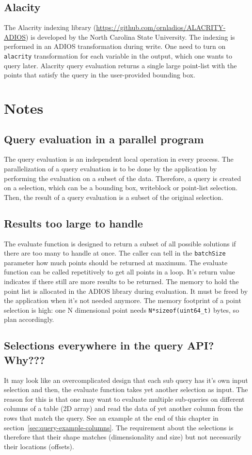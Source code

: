 \subsection{Alacity}
The Alacrity indexing library (\url{https://github.com/ornladios/ALACRITY-ADIOS}) is developed by the North Carolina State University. The indexing is performed in an ADIOS transformation during write. One need to turn on \verb+alacrity+ transformation for each variable in the output, which one wants to query later. Alacrity query evaluation returns a single large point-list with the points that satisfy the query in the user-provided bounding box. 


%
%
\section{Notes}

\subsection{Query evaluation in a parallel program}
The query evaluation is an independent local operation in every process. The parallelization of a query evaluation is to be done by the application by performing the evaluation on a subset of the data. Therefore, a query is created on a selection, which can be a bounding box, writeblock or point-list selection. Then, the result of a query evaluation is a subset of the original selection.  

\subsection{Results too large to handle}
The evaluate function is designed to return a subset of all possible solutions if there are too many to handle at once. The caller can tell in the \verb+batchSize+ parameter how much points should be returned at maximum. The evaluate function can be called repetitively to get all points in a loop. It's return value indicates if there still are more results to be returned. The memory to hold the point list is allocated in the ADIOS library during evaluation. It must be freed by the application when it's not needed anymore. The memory footprint of a point selection is high: one N dimensional point needs \verb+N*sizeof(uint64_t)+ bytes, so plan accordingly. 

\subsection{Selections everywhere in the query API? Why???}
It may look like an overcomplicated design that each sub query has it's own input selection and then, the evaluate function takes yet another selection as input. The reason for this is that one may want to evaluate multiple sub-queries on different columns of a table (2D array) and read the data of yet another column from the rows that match the query. See an example at the end of this chapter in section~\ref{sec:query-example-columns}. The requirement about the selections is therefore that their shape matches (dimensionality and size) but not necessarily their locations (offsets).

